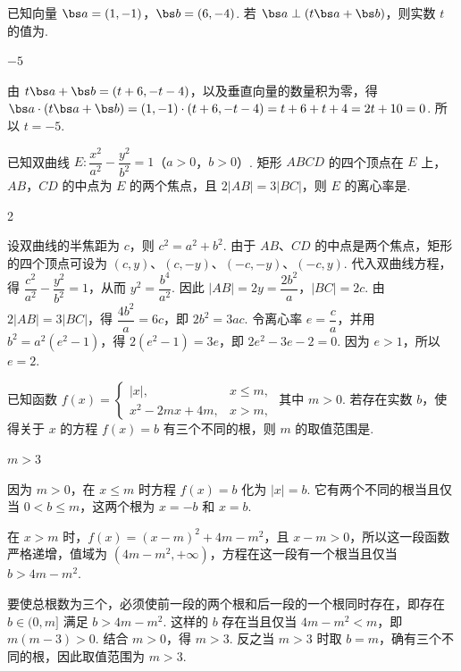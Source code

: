 \begin{problem}
已知向量 \(\bs a=(1,-1)\)，\(\bs b=(6,-4)\). 若 \(\bs a\perp(t\bs a+\bs b)\)，则实数 \(t\) 的值为\fillinblank{}.
\end{problem}

\begin{answer}
\(-5\)
\end{answer}

\begin{solution}
由 \(t\bs a+\bs b=(t+6,-t-4)\)，以及垂直向量的数量积为零，得 \(\bs a\cdot(t\bs a+\bs b)=(1,-1)\cdot(t+6,-t-4)=t+6+t+4=2t+10=0\). 所以 \(t=-5\).
\end{solution}

\begin{problem}
已知双曲线 \(E:\dfrac{x^2}{a^2}-\dfrac{y^2}{b^2}=1\)（\(a>0\)，\(b>0\)）. 矩形 \(ABCD\) 的四个顶点在 \(E\) 上，\(AB\)，\(CD\) 的中点为 \(E\) 的两个焦点，且 \(2|AB|=3|BC|\)，则 \(E\) 的离心率是\fillinblank{}.
\end{problem}

\begin{answer}
2
\end{answer}

\begin{solution}
设双曲线的半焦距为 \(c\)，则 \(c^2=a^2+b^2\). 由于 \(AB\)、\(CD\) 的中点是两个焦点，矩形的四个顶点可设为 \((c,y)\)、\((c,-y)\)、\((-c,-y)\)、\((-c,y)\). 代入双曲线方程，得 \(\dfrac{c^2}{a^2}-\dfrac{y^2}{b^2}=1\)，从而 \(y^2=\dfrac{b^4}{a^2}\). 因此 \(|AB|=2y=\dfrac{2b^2}{a}\)，\(|BC|=2c\). 由 \(2|AB|=3|BC|\)，得 \(\dfrac{4b^2}{a}=6c\)，即 \(2b^2=3ac\). 令离心率 \(e=\dfrac ca\)，并用 \(b^2=a^2(e^2-1)\)，得 \(2(e^2-1)=3e\)，即 \(2e^2-3e-2=0\). 因为 \(e>1\)，所以 \(e=2\).
\end{solution}

\begin{problem}
已知函数
\(f(x)=\begin{cases}
|x|,&x\leq m,\\
x^2-2mx+4m,&x>m,
\end{cases}\)
其中 \(m>0\). 若存在实数 \(b\)，使得关于 \(x\) 的方程 \(f(x)=b\) 有三个不同的根，则 \(m\) 的取值范围是\fillinblank{}.
\end{problem}

\begin{answer}
\(m>3\)
\end{answer}

\begin{solution}
因为 \(m>0\)，在 \(x\leq m\) 时方程 \(f(x)=b\) 化为 \(|x|=b\). 它有两个不同的根当且仅当 \(0<b\leq m\)，这两个根为 \(x=-b\) 和 \(x=b\).

在 \(x>m\) 时，\(f(x)=(x-m)^2+4m-m^2\)，且 \(x-m>0\)，所以这一段函数严格递增，值域为 \((4m-m^2,+\infty)\)，方程在这一段有一个根当且仅当 \(b>4m-m^2\).

要使总根数为三个，必须使前一段的两个根和后一段的一个根同时存在，即存在 \(b\in(0,m]\) 满足 \(b>4m-m^2\). 这样的 \(b\) 存在当且仅当 \(4m-m^2<m\)，即 \(m(m-3)>0\). 结合 \(m>0\)，得 \(m>3\). 反之当 \(m>3\) 时取 \(b=m\)，确有三个不同的根，因此取值范围为 \(m>3\).
\end{solution}

